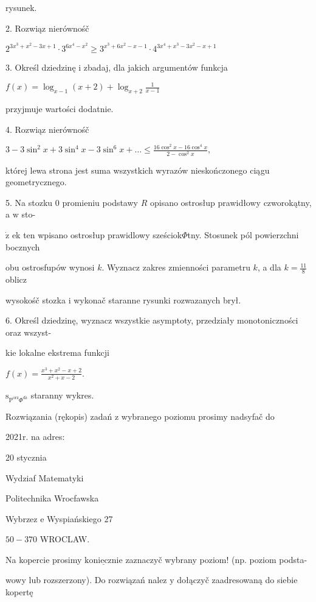 \documentclass[a4paper,12pt]{article}
\begin{document}
rysunek.

2. Rozwiąz nierównośč

$2^{3x^{3}+x^{2}-3x+1}\cdot 3^{6x^{4}-x^{2}}\geq 3^{x^{3}+6x^{2}-x-1}\cdot 4^{3x^{4}+x^{3}-3x^{2}-x+1}$

3. Określ dziedzinę $\mathrm{i}$ zbadaj, dla jakich argumentów funkcja

$f(x)=\displaystyle \log_{x-1}(x+2)+\log_{x+2}\frac{1}{x-1}$

przyjmuje wartości dodatnie.

4. Rozwiąz nierównośč

$3-3\displaystyle \sin^{2}x+3\sin^{4}x-3\sin^{6}x+\ldots\leq\frac{16\cos^{2}x-16\cos^{4}x}{2-\cos^{2}x},$

której lewa strona jest suma wszystkich wyrazów nieskończonego ciągu geometrycznego.

5. Na stozku $0$ promieniu podstawy $R$ opisano ostrosłup prawidłowy czworokątny, a $\mathrm{w}$ sto-

$\dot{\mathrm{z}}$ ek ten wpisano ostrosłup prawidlowy sześciok$\Phi$tny. Stosunek pól powierzchni bocznych

obu ostrosfupów wynosi $k$. Wyznacz zakres zmienności parametru $k$, a dla $k=\displaystyle \frac{11}{8}$ oblicz

wysokośč stozka $\mathrm{i}$ wykonač staranne rysunki rozwazanych brył.

6. Określ dziedzinę, wyznacz wszystkie asymptoty, przedziały monotoniczności oraz wszyst-

kie lokalne ekstrema funkcji

$f(x)=\displaystyle \frac{x^{3}+x^{2}-x+2}{x^{2}+x-2}.$

$\mathrm{s}_{\mathrm{P}^{\mathrm{o}\mathrm{r}\mathrm{z}}\Phi^{\mathrm{d}\acute{\mathrm{z}}}}$ staranny wykres.

Rozwiązania (rękopis) zadań z wybranego poziomu prosimy nadsyfač do

2021r. na adres:

20 stycznia

Wydziaf Matematyki

Politechnika Wrocfawska

Wybrzez $\mathrm{e}$ Wyspiańskiego 27

$50-370$ WROCLAW.

Na kopercie prosimy $\underline{\mathrm{k}\mathrm{o}\mathrm{n}\mathrm{i}\mathrm{e}\mathrm{c}\mathrm{z}\mathrm{n}\mathrm{i}\mathrm{e}}$ zaznaczyč wybrany poziom! (np. poziom podsta-

wowy lub rozszerzony). Do rozwiązań nalez $\mathrm{y}$ dołączyč zaadresowaną do siebie kopertę
\end{document}
